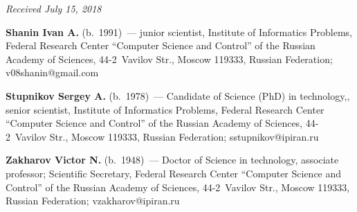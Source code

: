 \hfill{\small\textit{Received July 15, 2018}}

\pagebreak

      
      \Contr
      
      \noindent
      \textbf{Shanin Ivan A.} (b.\ 1991)~--- junior scientist, Institute of Informatics 
Problems, Federal Research Center ``Computer Science and Control'' of the Russian 
Academy of Sciences, 44-2~Vavilov Str., Moscow 119333, Russian Federation; 
\mbox{v08shanin@gmail.com}

\vspace*{5pt}
      
      \noindent
      \textbf{Stupnikov Sergey A.} (b.\ 1978)~--- Candidate of Science (PhD) in 
technology,, senior scientist, Institute of Informatics Problems, Federal Research 
Center ``Computer Science and Control'' of the Russian Academy of Sciences,  
44-2~Vavilov Str., Moscow 119333, Russian Federation; 
\mbox{sstupnikov@ipiran.ru}

\vspace*{5pt}
      
      \noindent
      \textbf{Zakharov Victor N.} (b.\ 1948)~--- Doctor of Science in technology, 
associate professor; Scientific Secretary, Federal Research Center ``Computer 
Science and Control'' of the Russian Academy of Sciences, 44-2~Vavilov Str., 
Moscow 119333, Russian Federation; \mbox{vzakharov@ipiran.ru}
\label{end\stat}

\renewcommand{\bibname}{\protect\rm Литература}       
